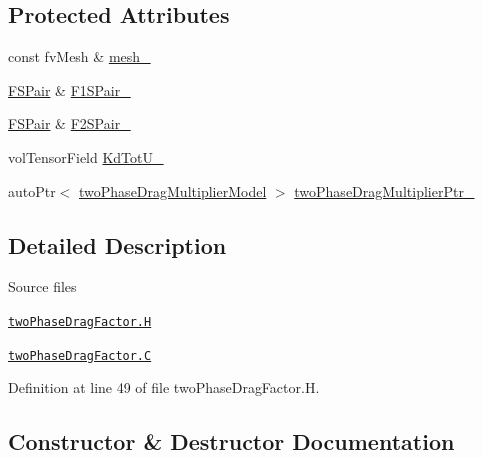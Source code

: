 \subsection*{Protected Attributes}
\begin{DoxyCompactItemize}
\item 
const fv\+Mesh \& \hyperlink{classFoam_1_1twoPhaseDragFactor_a23edeeeecebcef11921a33dd5d990570}{mesh\+\_\+}
\item 
\hyperlink{classFoam_1_1FSPair}{F\+S\+Pair} \& \hyperlink{classFoam_1_1twoPhaseDragFactor_af3a12320f740bb4ca1828b2f34bec5f7}{F1\+S\+Pair\+\_\+}
\item 
\hyperlink{classFoam_1_1FSPair}{F\+S\+Pair} \& \hyperlink{classFoam_1_1twoPhaseDragFactor_a88ca465d040a409212704e0fcf9cd098}{F2\+S\+Pair\+\_\+}
\item 
vol\+Tensor\+Field \hyperlink{classFoam_1_1twoPhaseDragFactor_a5ccb0672e7af52764436b6168f730115}{Kd\+Tot\+U\+\_\+}
\item 
auto\+Ptr$<$ \hyperlink{classFoam_1_1twoPhaseDragMultiplierModel}{two\+Phase\+Drag\+Multiplier\+Model} $>$ \hyperlink{classFoam_1_1twoPhaseDragFactor_a744a6edf75f6e01b0e1eccb746e726cd}{two\+Phase\+Drag\+Multiplier\+Ptr\+\_\+}
\end{DoxyCompactItemize}


\subsection{Detailed Description}
\begin{DoxyParagraph}{Source files}

\begin{DoxyItemize}
\item \href{../../../home/carlo/data/GeN-Foam/GeN-Foam_ffn/GeN-Foam/GeN-Foam/classes/thermalHydraulics/src/physicsModels/dragModels/twoPhaseDragFactor.H}{\tt two\+Phase\+Drag\+Factor.\+H} 
\item \href{../../../home/carlo/data/GeN-Foam/GeN-Foam_ffn/GeN-Foam/GeN-Foam/classes/thermalHydraulics/src/physicsModels/dragModels/twoPhaseDragFactor.C}{\tt two\+Phase\+Drag\+Factor.\+C} 
\end{DoxyItemize}
\end{DoxyParagraph}


Definition at line 49 of file two\+Phase\+Drag\+Factor.\+H.



\subsection{Constructor \& Destructor Documentation}
\mbox{\label{classFoam_1_1twoPhaseDragFactor_ab9cd34996b3a2f10cebe1e234c53d0ca}} 
